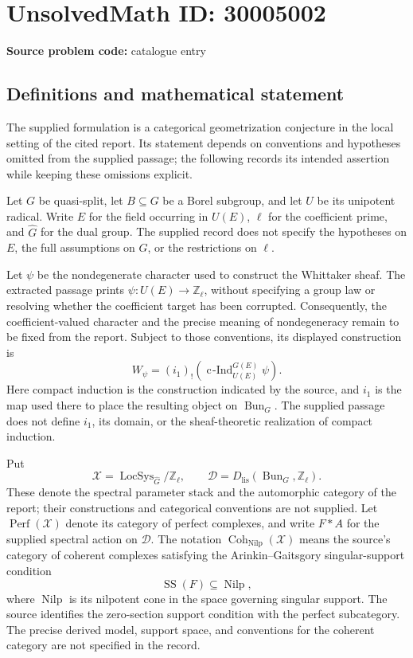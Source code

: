 \documentclass[11pt]{article}
\begin{document}
\section*{UnsolvedMath ID: 30005002}
\textbf{Source problem code:} catalogue entry
\subsection{Definitions and mathematical statement}
The supplied formulation is a categorical geometrization conjecture in the local setting of the cited report. Its statement depends on conventions and hypotheses omitted from the supplied passage; the following records its intended assertion while keeping these omissions explicit.

Let \(G\) be quasi-split, let \(B\subseteq G\) be a Borel subgroup, and let \(U\) be its unipotent radical. Write \(E\) for the field occurring in \(U(E)\), \(\ell\) for the coefficient prime, and \(\widehat G\) for the dual group. The supplied record does not specify the hypotheses on \(E\), the full assumptions on \(G\), or the restrictions on \(\ell\).

Let \(\psi\) be the nondegenerate character used to construct the Whittaker sheaf. The extracted passage prints \(\psi:U(E)\to\mathbb Z_\ell\), without specifying a group law or resolving whether the coefficient target has been corrupted. Consequently, the coefficient-valued character and the precise meaning of nondegeneracy remain to be fixed from the report. Subject to those conventions, its displayed construction is
\[
W_\psi=(i_1)_!\left(\operatorname{c\!\operatorname{-}Ind}_{U(E)}^{G(E)}\psi\right).
\]
Here compact induction is the construction indicated by the source, and \(i_1\) is the map used there to place the resulting object on \(\operatorname{Bun}_G\). The supplied passage does not define \(i_1\), its domain, or the sheaf-theoretic realization of compact induction.

Put
\[
\mathcal X=\operatorname{LocSys}_{\widehat G}/\mathbb Z_\ell,
\qquad
\mathcal D=D_{\mathrm{lis}}(\operatorname{Bun}_G,\mathbb Z_\ell).
\]
These denote the spectral parameter stack and the automorphic category of the report; their constructions and categorical conventions are not supplied. Let \(\operatorname{Perf}(\mathcal X)\) denote its category of perfect complexes, and write \(F*A\) for the supplied spectral action on \(\mathcal D\). The notation \(\operatorname{Coh}_{\mathrm{Nilp}}(\mathcal X)\) means the source's category of coherent complexes satisfying the Arinkin--Gaitsgory singular-support condition
\[
\operatorname{SS}(F)\subseteq\operatorname{Nilp},
\]
where \(\operatorname{Nilp}\) is its nilpotent cone in the space governing singular support. The source identifies the zero-section support condition with the perfect subcategory. The precise derived model, support space, and conventions for the coherent category are not specified in the record.
\end{document}
